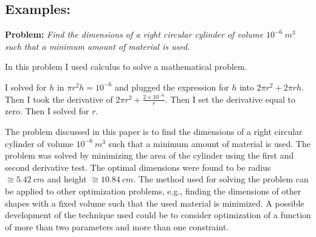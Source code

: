 \secondpage

\subsection*{Examples:}

{\bf Problem:}
  \emph{Find
        the dimensions of a right circular cylinder of volume
        $10^{-6}\ m^3$ such that a minimum amount of material is
        used.}  

\bigskip

      \begin{badexample}
        In this problem I used calculus to solve a mathematical
        problem.\\
    \end{badexample}

\bigskip

    \begin{badexample}
      I solved for $h$ in $\pi r^2h=10^{-6}$ and plugged the
      expression for $h$ into $2\pi r^2+2\pi rh$. Then I took the
      derivative of $2\pi r^2+\frac{2\times 10^{-6}}{r}$. Then I set
      the derivative equal to zero. Then I solved for $r$.
    \end{badexample}


\noindent{}

\bigskip

    \begin{goodexample}
      The problem discussed in this paper is to find the dimensions of
      a right circular cylinder of volume $10^{-6}\ m^3$ such that a
      minimum amount of material is used. The problem was solved by
      minimizing the area of the cylinder using the first and second
      derivative test. The optimal dimensions were found to be radius
      $\cong 5.42\ cm$ and height $\cong 10.84\ cm$. The method used
      for solving the problem can be applied to other optimization
      problems, e.g., finding the dimensions of other shapes with a
      fixed volume such that the used material is minimized. A
      possible development of the technique used could be to consider
      optimization of a function of more than two parameters and more
      than one constraint.
    \end{goodexample}

\noindent{}

